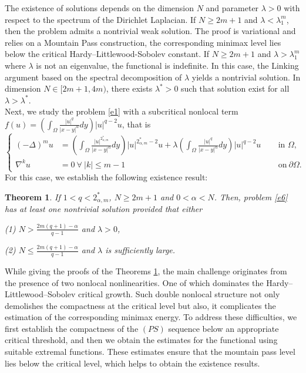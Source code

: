 \documentclass[reqno]{amsart}
\newtheorem{theorem}{Theorem}
\newcommand{\DD} {\displaystyle}
\newcommand{\la} {\lambda}
\newcommand{\Om}{\Omega}
\newcommand{\al} {\alpha}
\newcommand{\noi} {  \noindent}
\numberwithin{theorem}{section} \numberwithin{equation}{section}
\begin{document}
\noi The existence of solutions depends on the dimension $N$ and parameter $\la>0$ with respect to the spectrum of the Dirichlet Laplacian.
If $N\geq2m+1$ and $\la<\la^{m}_1$, then the problem admits a nontrivial weak solution. The proof is variational and relies on a Mountain Pass construction, the corresponding minimax level lies below the critical Hardy–Littlewood-Sobolev constant. If $N\geq 2m+1$ and $\la>\la^{m}_1$ where $\la$ is not an eigenvalue, the functional is indefinite. In this case, the Linking argument based on the spectral decomposition of $\la$ yields a nontrivial solution. In dimension $N\in [2m+1, 4m)$, there exists $\la^*>0$ such that solution exist for all $\la>\la^*$.\\ 

\noi Next, we study the problem \eqref{e1} with a subcritical nonlocal term $f(u)= \left(\DD\int_{\Om} \frac{|u|^q}{|x-y|^\al} d y\right)|u|^{q-2} u$, that is
\begin{equation}\label{e6}
\left\{
\begin{aligned}
(-\Delta)^m u&=\left(\DD\int_{\Om} \frac{|u|^{2_{\al, m}^*} }{|x-y|^\al} d y\right)|u|^{2_{\al, m}^*-2} u+\la\left(\DD\int_{\Om} \frac{|u|^q}{|x-y|^\al} d y\right)|u|^{q-2} u \,&& \text{ in } \Om, \\
\nabla^k u&=0\ \forall \ |k|\leq m-1 \,&&  \text { on}\   \partial\Om. 
\end{aligned}\right.
\end{equation}
For this case, we establish the following existence result:
\begin{theorem}\label{t2}
If $1<q<2_{\al, m}^*$, $N\geq2m+1$ and $0<\al<N$. Then, problem \eqref{e6} has at least one nontrivial solution provided that either \\
\item (1) $N>\frac{2m(q+1)-\al}{q-1}$ and $\la>0$,
\item (2) $N \leq \frac{2m(q+1)-\al}{q-1}$ and $\la$ is sufficiently large.
\end{theorem}
\noi While giving the proofs of the Theorems \ref{t2}, the main challenge originates from the presence of two nonlocal nonlinearities. One of which dominates the Hardy--Littlewood--Sobolev critical growth. Such  double nonlocal structure not only demolishes the compactness at the critical level but also, it complicates the estimation of the corresponding minimax energy. To address these difficulties, we first establish the compactness of the $(PS)$ sequence below an appropriate critical threshold, and then we obtain the estimates for the functional using suitable extremal functions. These estimates ensure that the mountain pass level lies below the critical level, which helps to obtain the existence results.\\
\end{document}
